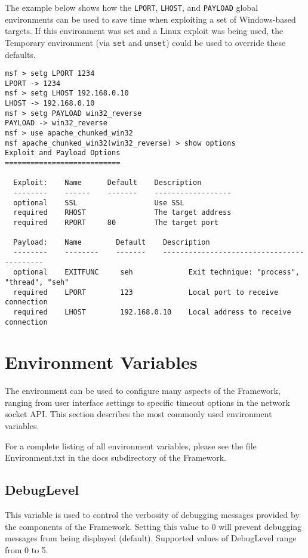 \documentclass{report}
\begin{document}
\par
The example below shows how the \texttt{LPORT}, \texttt{LHOST}, and
\texttt{PAYLOAD} global environments can be used to save time when exploiting a
set of Windows-based targets. If this environment was set and a Linux exploit
was being used, the Temporary environment (via \texttt{set} and \texttt{unset})
could be used to override these defaults.  

\begin{verbatim}
msf > setg LPORT 1234
LPORT -> 1234
msf > setg LHOST 192.168.0.10 
LHOST -> 192.168.0.10
msf > setg PAYLOAD win32_reverse
PAYLOAD -> win32_reverse
msf > use apache_chunked_win32 
msf apache_chunked_win32(win32_reverse) > show options 
Exploit and Payload Options
===========================

  Exploit:    Name      Default    Description
  --------    ------    -------    ------------------    
  optional    SSL                  Use SSL
  required    RHOST                The target address
  required    RPORT     80         The target port
  
  Payload:    Name        Default    Description
  --------    --------    -------    ------------------------------------------    
  optional    EXITFUNC     seh             Exit technique: "process", "thread", "seh"
  required    LPORT        123             Local port to receive connection
  required    LHOST        192.168.0.10    Local address to receive connection
\end{verbatim}


    \section{Environment Variables}
    \label{ENV-VAR}
\par
The environment can be used to configure many aspects of the Framework, ranging
from user interface settings to specific timeout options in the network socket
API. This section describes the most commonly used environment variables.  

\par
For a complete listing of all environment variables, please see the file
Environment.txt in the docs subdirectory of the Framework. 


	\subsection{DebugLevel}
\par
This variable is used to control the verbosity of debugging messages provided by
the components of the Framework. Setting this value to 0 will prevent debugging
messages from being displayed (default). Supported values of DebugLevel range from 0 to 5. 
\end{document}
